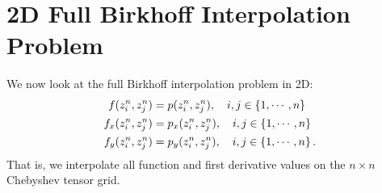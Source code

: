 \section{2D Full Birkhoff Interpolation Problem}
\label{sec:CV_2D_full_birkhoff}

We now look at the full Birkhoff interpolation problem in 2D:
%
\begin{align}
    f(z_{i}^{n},z_{j}^{n}) &= p(z_{i}^{n},z_{j}^{n}),
        \quad i,j\in\left\{ 1,\cdots,n \right\} \nonumber\\
    f_{x}(z_{i}^{n},z_{j}^{n}) &= p_{x}(z_{i}^{n},z_{j}^{n}),
        \quad i,j\in\left\{ 1,\cdots,n \right\} \nonumber\\
    f_{y}(z_{i}^{n},z_{j}^{n}) &= p_{y}(z_{i}^{n},z_{j}^{n}),
        \quad i,j\in\left\{ 1,\cdots,n \right\}.
\end{align}
%
That is, we interpolate all function and first derivative values
on the $n\times n$ Chebyshev tensor grid.

